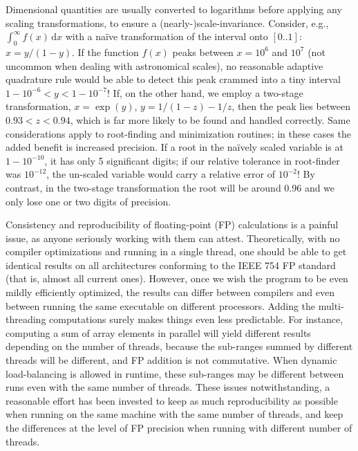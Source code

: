 \documentclass[12pt]{article}
\renewcommand{\d}{\mathrm{d}}
\begin{document}
Dimensional quantities are usually converted to logarithms before applying any scaling transformations, to ensure a (nearly-)scale-invariance. Consider, e.g., $\int_0^\infty f(x)\,\d x$ with a na\"ive transformation of the interval onto $[0..1]$: $x = y/(1-y)$. If the function $f(x)$ peaks between $x=10^6$ and $10^7$ (not uncommon when dealing with astronomical scales), no reasonable adaptive quadrature rule would be able to detect this peak crammed into a tiny interval $1-10^{-6} < y < 1-10^{-7}$! If, on the other hand, we employ a two-stage transformation, $x = \exp(y)$, $y = 1/(1-z)-1/z$, then the peak lies between $0.93<z<0.94$, which is far more likely to be found and handled correctly. Same considerations apply to root-finding and minimization routines; in these cases the added benefit is increased precision. If a root in the na\"ively scaled variable is at $1-10^{-10}$, it has only 5 significant digits; if our relative tolerance in root-finder was $10^{-12}$, the un-scaled variable would carry a relative error of $10^{-2}$! By contrast, in the two-stage transformation the root will be around 0.96 and we only lose one or two digits of precision.

Consistency and reproducibility of floating-point (FP) calculations is a painful issue, as anyone seriously working with them can attest. Theoretically, with no compiler optimizations and running in a single thread, one should be able to get identical results on all architectures conforming to the IEEE 754 FP standard (that is, almost all current ones). However, once we wish the program to be even mildly efficiently optimized, the results can differ between compilers and even between running the same executable on different processors. Adding the multi-threading computations surely makes things even less predictable. For instance, computing a sum of array elements in parallel will yield different results depending on the number of threads, because the sub-ranges summed by different threads will be different, and FP addition is not commutative. When dynamic load-balancing is allowed in runtime, these sub-ranges may be different between runs even with the same number of threads. These issues notwithstanding, a reasonable effort has been invested to keep as much reproducibility as possible when running on the same machine with the same number of threads, and keep the differences at the level of FP precision when running with different number of threads.
\end{document}
